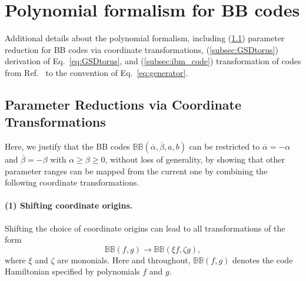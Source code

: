 \documentclass[aps,prl,english,superscriptaddress,twocolumn,tightenlines,showpacs,longbibliography,floatfix,amsfonts]{revtex4-2}
\begin{document}
\section{Polynomial formalism for BB codes}\label{app:ring}


Additional details about the polynomial formalism, including (\ref{subsec:Para}) parameter reduction for BB codes via coordinate transformations,
(\ref{subsec:GSDtorus}) derivation of Eq.~\eqref{eq:GSDtorus}, and (\ref{subsec:ibm_code}) transformation of codes from Ref.~\cite{Bravyi24} to the convention of Eq.~\eqref{eq:generator}. 

\subsection{Parameter Reductions via Coordinate Transformations}\label{subsec:Para}

Here, we justify that the BB codes $\mathbb{BB}(\overline{\alpha},\overline{\beta},a,b)$
can be restricted to $\overline{\alpha}=-\alpha$ and $\overline{\beta}=-\beta$
with $\alpha\geq\beta\geq0$, without loss of generality, by showing that other parameter ranges can
be mapped from the current one by combining the following coordinate transformations. 

\paragraph{(1) Shifting coordinate origins. }

Shifting the choice of coordinate origins can lead to all transformations
of the form
\begin{equation}
	\mathbb{BB}\left(f,g\right)\rightarrow\mathbb{BB}\left(\xi f,\zeta g\right),\label{eq:shift_origin}
\end{equation}
where $\xi$ and $\zeta$ are mononials. Here and throughout, $\mathbb{BB}\left(f,g\right)$
denotes the code Hamiltonian specified by polynomials $f$ and $g$.
\end{document}
